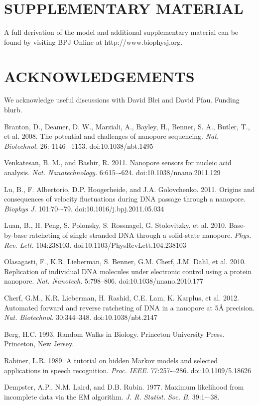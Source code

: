 \documentclass{biophys_letter}
\begin{document}
\section*{SUPPLEMENTARY MATERIAL}

A full derivation of the model and additional supplementary material can be found by visiting BPJ Online at http://www.biophysj.org.\vspace*{6pt}

\section*{ACKNOWLEDGEMENTS}

We acknowledge useful discussions with David Blei and David Pfau. Funding blurb.

\begin{thebibliography}{99}

  Branton, D., Deamer, D. W., Marziali, A., Bayley, H., Benner, S. A., Butler, T., et al.
  2008.
  The potential and challenges of nanopore sequencing.
  {\it Nat. Biotechnol.}
  26: 1146-–1153.
  doi:10.1038/nbt.1495

  Venkatesan, B. M., and Bashir, R.
  2011.
  Nanopore sensors for nucleic acid analysis.
  {\it Nat. Nanotechnology.}
  6:615–-624.
  doi:10.1038/nnano.2011.129

  Lu, B., F. Albertorio, D.P. Hoogerheide, and J.A. Golovchenko.
  2011.
  Origins and consequences of velocity fluctuations during DNA passage through a nanopore.
  {\it Biophys J.}
  101:70–-79.
  doi:10.1016/j.bpj.2011.05.034

  Luan, B., H. Peng, S. Polonsky, S. Rossnagel, G. Stolovitzky, et al.
  2010.
  Base-by-base ratcheting of single stranded DNA through a solid-state nanopore.
  {\it Phys. Rev. Lett.}
  104:238103.
  doi:10.1103/PhysRevLett.104.238103

  Olasagasti, F., K.R. Lieberman, S. Benner, G.M. Cherf, J.M. Dahl, et al.
  2010.
  Replication of individual DNA molecules under electronic control using a protein nanopore.
  {\it Nat. Nanotech.}
  5:798–806.
  doi:10.1038/nnano.2010.177

  Cherf, G.M., K.R. Lieberman, H. Rashid, C.E. Lam, K. Karplus, et al.
  2012.
  Automated forward and reverse ratcheting of DNA in a nanopore at 5{\AA} precision.
  {\it Nat. Biotechnol.}
  30:344--348.
  doi:10.1038/nbt.2147

  Berg, H.C.
  1993.
  Random Walks in Biology.
  Princeton University Press.
  Princeton, New Jersey.

  Rabiner, L.R.
  1989.
  A tutorial on hidden Markov models and selected applications in speech recognition.
  {\it Proc. IEEE.}
  77:257-–286.
  doi:10.1109/5.18626

  Dempster, A.P., N.M. Laird, and D.B. Rubin.
  1977.
  Maximum likelihood from incomplete data via the EM algorithm.
  {\it J. R. Statist. Soc. B.}
  39:1-–38.

\end{thebibliography}

\end{document}
